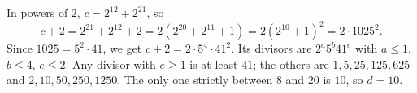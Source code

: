 In powers of $2$, $c=2^{12}+2^{21}$, so
\[c+2=2^{21}+2^{12}+2=2\left(2^{20}+2^{11}+1\right)=2\left(2^{10}+1\right)^2=2\cdot1025^2.\]
Since $1025=5^2\cdot41$, we get $c+2=2\cdot5^4\cdot41^2$. Its divisors are $2^a5^b41^e$ with $a\le1$, $b\le4$, $e\le2$. Any divisor with $e\ge1$ is at least $41$; the others are $1,5,25,125,625$ and $2,10,50,250,1250$. The only one strictly between $8$ and $20$ is $10$, so $d=\boxed{10}$.
